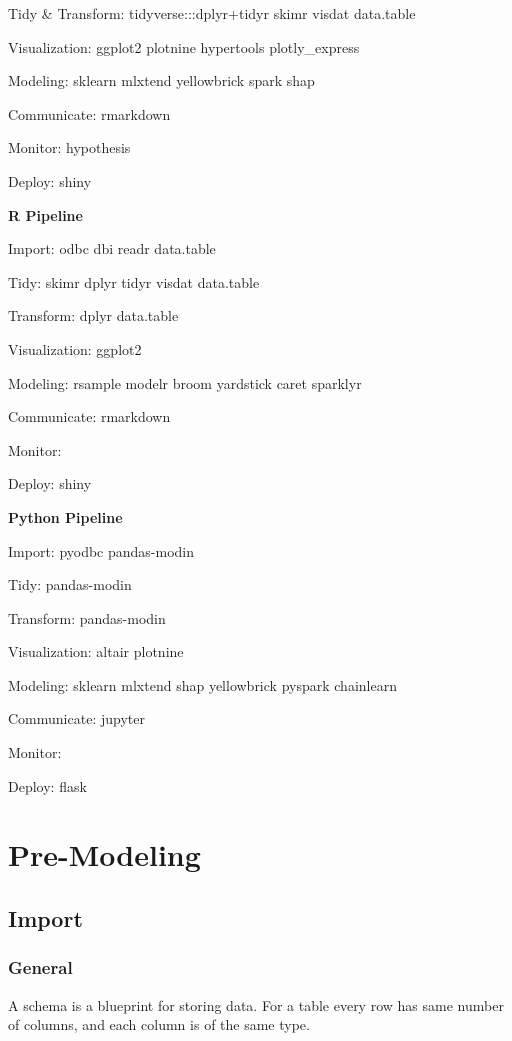 \documentclass[]{book}
\begin{document}
Tidy \& Transform: tidyverse:::dplyr+tidyr skimr visdat data.table

Visualization: ggplot2 plotnine hypertools plotly\_express

Modeling: sklearn mlxtend yellowbrick spark shap

Communicate: rmarkdown

Monitor: hypothesis

Deploy: shiny

\textbf{R Pipeline}

Import: odbc dbi readr data.table

Tidy: skimr dplyr tidyr visdat data.table

Transform: dplyr data.table

Visualization: ggplot2

Modeling: rsample modelr broom yardstick caret sparklyr

Communicate: rmarkdown

Monitor:

Deploy: shiny

\textbf{Python Pipeline}

Import: pyodbc pandas-modin

Tidy: pandas-modin

Transform: pandas-modin

Visualization: altair plotnine

Modeling: sklearn mlxtend shap yellowbrick pyspark chainlearn

Communicate: jupyter

Monitor:

Deploy: flask

\hypertarget{pre-modeling-1}{%
\chapter{Pre-Modeling}\label{pre-modeling-1}}

\hypertarget{import}{%
\section{Import}\label{import}}

\hypertarget{general}{%
\subsection{General}\label{general}}

A schema is a blueprint for storing data. For a table every row has same number of columns, and each column is of the same type.
\end{document}
